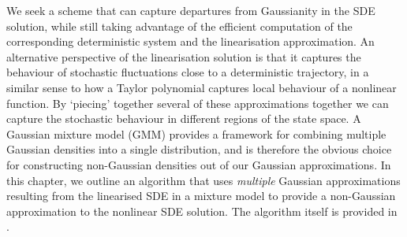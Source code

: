 



We seek a scheme that can capture departures from Gaussianity in the SDE solution, while still taking advantage of the efficient computation of the corresponding deterministic system and the linearisation approximation.
An alternative perspective of the linearisation solution is that it captures the behaviour of stochastic fluctuations close to a deterministic trajectory, in a similar sense to how a Taylor polynomial captures local behaviour of a nonlinear function.
By `piecing' together several of these approximations together we can capture the stochastic behaviour in different regions of the state space.
A Gaussian mixture model (GMM) provides a framework for combining multiple Gaussian densities into a single distribution, and is therefore the obvious choice for constructing non-Gaussian densities out of our Gaussian approximations.
In this chapter, we outline an algorithm that uses \emph{multiple} Gaussian approximations resulting from the linearised SDE in a mixture model to provide a non-Gaussian approximation to the nonlinear SDE solution.
The algorithm itself is provided in .


